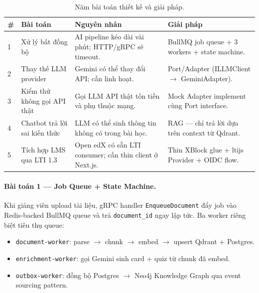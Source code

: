 \begin{table}[H]
    \centering
    \caption{Năm bài toán thiết kế và giải pháp.}
    \label{tab:design-problems}
    \begin{tabular}{p{0.5cm}p{4cm}p{4cm}p{5.5cm}}
        \toprule
        \textbf{\#} & \textbf{Bài toán} & \textbf{Nguyên nhân} & \textbf{Giải pháp} \\
        \midrule
        1 & Xử lý bất đồng bộ
          & AI pipeline kéo dài vài phút; HTTP/gRPC sẽ timeout.
          & BullMQ job queue + 3 workers + state machine. \\
        \midrule
        2 & Thay thế LLM provider
          & Gemini có thể thay đổi API; cần linh hoạt.
          & Port/Adapter (ILLMClient $\to$ GeminiAdapter). \\
        \midrule
        3 & Kiểm thử không gọi API thật
          & Gọi LLM API thật tốn tiền và phụ thuộc mạng.
          & Mock Adapter implement cùng Port interface. \\
        \midrule
        4 & Chatbot trả lời sai kiến thức
          & LLM có thể sinh thông tin không có trong bài học.
          & RAG --- chỉ trả lời dựa trên context từ Qdrant. \\
        \midrule
        5 & Tích hợp LMS qua LTI 1.3
          & Open edX có sẵn LTI consumer; cần thin client ở Next.js.
          & Thin XBlock glue + ltijs Provider + OIDC flow. \\
        \bottomrule
    \end{tabular}
\end{table}

\paragraph{Bài toán 1 --- Job Queue + State Machine.}

Khi giảng viên upload tài liệu, gRPC handler \texttt{EnqueueDocument}
đẩy job vào Redis-backed BullMQ queue và trả \texttt{document\_id}
ngay lập tức. Ba worker riêng biệt tiêu thụ queue:

\begin{itemize}
    \item \texttt{document-worker}: parse $\to$ chunk $\to$ embed
          $\to$ upsert Qdrant + Postgres.
    \item \texttt{enrichment-worker}: gọi Gemini sinh card + quiz
          từ chunk đã embed.
    \item \texttt{outbox-worker}: đồng bộ Postgres $\to$ Neo4j
          Knowledge Graph qua event sourcing pattern.
\end{itemize}

